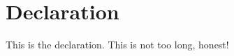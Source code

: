 \chapter*{Declaration}


This is the declaration. This is not too long, honest!

\cleardoublepage

\endinput
